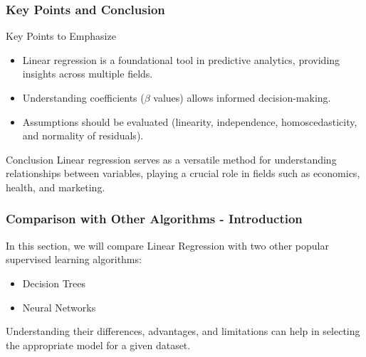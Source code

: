 \documentclass[aspectratio=169]{beamer}
\begin{document}
\begin{frame}[fragile]
    \frametitle{Key Points and Conclusion}
    \begin{block}{Key Points to Emphasize}
        \begin{itemize}
            \item Linear regression is a foundational tool in predictive analytics, providing insights across multiple fields.
            \item Understanding coefficients ($\beta$ values) allows informed decision-making.
            \item Assumptions should be evaluated (linearity, independence, homoscedasticity, and normality of residuals).
        \end{itemize}
    \end{block}
    \begin{block}{Conclusion}
        Linear regression serves as a versatile method for understanding relationships between variables, playing a crucial role in fields such as economics, health, and marketing.
    \end{block}
\end{frame}

\begin{frame}[fragile]
    \frametitle{Comparison with Other Algorithms - Introduction}
    In this section, we will compare Linear Regression with two other popular supervised learning algorithms: 
    \begin{itemize}
        \item Decision Trees
        \item Neural Networks
    \end{itemize}
    Understanding their differences, advantages, and limitations can help in selecting the appropriate model for a given dataset.
\end{frame}
\end{document}
